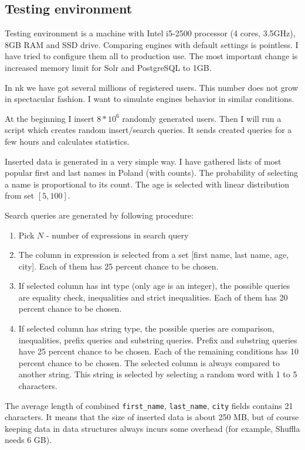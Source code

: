 \documentclass[10pt,a4paper]{article}
\begin{document}
\subsection{Testing environment}

Testing environment is a machine with Intel i5-2500 processor (4 cores, 3.5GHz), 8GB RAM and SSD drive. Comparing engines with default settings is pointless. I have tried to configure them all to production use. The most important change is increased memory limit for Solr and PostgreSQL to 1GB.

In nk we have got several millions of registered users. This number does not grow in spectacular fashion. I want to simulate engines behavior in similar conditions. 

At the beginning I insert $8 * 10^6$ randomly generated users. Then I will run a script which creates random insert/search queries. It sends created queries for a few hours and calculates statistics.

Inserted data is generated in a very simple way. I have gathered lists of most popular first and last names in Poland (with counts). The probability of selecting a name is proportional to its count. The age is selected with linear distribution from set $[5, 100]$. 

Search queries are generated by following procedure:
\begin{enumerate}
\item Pick $N$ - number of expressions in search query
\item The column in expression is selected from a set [first name, last name, age, city]. Each of them has 25 percent chance to be chosen.
\item If selected column has int type (only age is an integer), the possible queries are equality check, inequalities and strict inequalities. Each of them has 20 percent chance to be chosen.
\item If selected column has string type, the possible queries are comparison, inequalities, prefix queries and substring queries. Prefix and substring queries have 25 percent chance to be chosen. Each of the remaining conditions has 10 percent chance to be chosen. The selected column is always compared to another string. This string is selected by selecting a random word with 1 to 5 characters.
\end{enumerate}
The average length of combined \verb|first_name|, \verb|last_name|, \verb|city| fields contains 21 characters. It means that the size of inserted data is about 250 MB, but of course keeping data in data structures always incurs some overhead (for example, Shuffla needs 6 GB).
\end{document}
